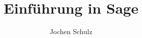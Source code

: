 {
  \usepackage{fullpage}
  \usepackage{pgf}
  \usepackage[xetex]{hyperref}
}

{
}
\usenavigationsymbolstemplate{}
\usepackage{multimedia}
\usepackage{fontspec,xunicode,xltxtra}


{
\leavevmode

\hfill\insertframenumber  \hspace{3pt}

  \vskip3pt%
}

\usepackage[ngerman]{babel}

%
%
\usepackage{amssymb}
\usepackage{amsthm}
\usepackage{amsmath}
\usepackage[framed]{mcode}

\usepackage{mydef}
\title{Einführung in Sage}
%

\author{Jochen Schulz}


